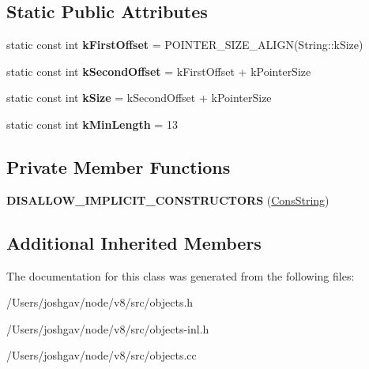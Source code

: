 \subsection*{Static Public Attributes}
\begin{DoxyCompactItemize}
\item 
static const int {\bfseries k\+First\+Offset} = P\+O\+I\+N\+T\+E\+R\+\_\+\+S\+I\+Z\+E\+\_\+\+A\+L\+I\+GN(String\+::k\+Size)\hypertarget{classv8_1_1internal_1_1_cons_string_a95a124eb7efeaba961e787defc3646ee}{}\label{classv8_1_1internal_1_1_cons_string_a95a124eb7efeaba961e787defc3646ee}

\item 
static const int {\bfseries k\+Second\+Offset} = k\+First\+Offset + k\+Pointer\+Size\hypertarget{classv8_1_1internal_1_1_cons_string_ad54aec7d731f2c13af79a6a57774370f}{}\label{classv8_1_1internal_1_1_cons_string_ad54aec7d731f2c13af79a6a57774370f}

\item 
static const int {\bfseries k\+Size} = k\+Second\+Offset + k\+Pointer\+Size\hypertarget{classv8_1_1internal_1_1_cons_string_a998544a7ba1a51c4803544dc17cb7882}{}\label{classv8_1_1internal_1_1_cons_string_a998544a7ba1a51c4803544dc17cb7882}

\item 
static const int {\bfseries k\+Min\+Length} = 13\hypertarget{classv8_1_1internal_1_1_cons_string_aa2d9a5efa6f974193d3b56fdc2d33044}{}\label{classv8_1_1internal_1_1_cons_string_aa2d9a5efa6f974193d3b56fdc2d33044}

\end{DoxyCompactItemize}
\subsection*{Private Member Functions}
\begin{DoxyCompactItemize}
\item 
{\bfseries D\+I\+S\+A\+L\+L\+O\+W\+\_\+\+I\+M\+P\+L\+I\+C\+I\+T\+\_\+\+C\+O\+N\+S\+T\+R\+U\+C\+T\+O\+RS} (\hyperlink{classv8_1_1internal_1_1_cons_string}{Cons\+String})\hypertarget{classv8_1_1internal_1_1_cons_string_a357e7c0b722fd6b9375b8f2e2e0b09ec}{}\label{classv8_1_1internal_1_1_cons_string_a357e7c0b722fd6b9375b8f2e2e0b09ec}

\end{DoxyCompactItemize}
\subsection*{Additional Inherited Members}


The documentation for this class was generated from the following files\+:\begin{DoxyCompactItemize}
\item 
/\+Users/joshgav/node/v8/src/objects.\+h\item 
/\+Users/joshgav/node/v8/src/objects-\/inl.\+h\item 
/\+Users/joshgav/node/v8/src/objects.\+cc\end{DoxyCompactItemize}
